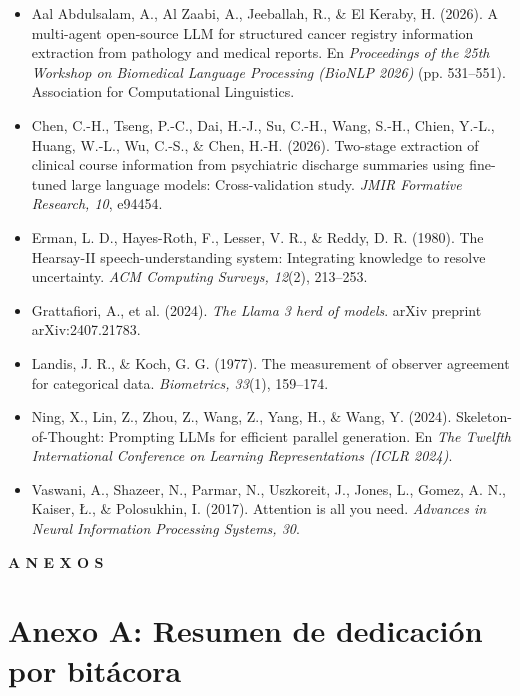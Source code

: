 \documentclass[12pt,letterpaper]{article}
\begin{document}
\begin{itemize}[leftmargin=1.27cm, label={}]
    \item Aal Abdulsalam, A., Al Zaabi, A., Jeeballah, R., \& El Keraby, H. (2026). A multi-agent open-source LLM for structured cancer registry information extraction from pathology and medical reports. En \textit{Proceedings of the 25th Workshop on Biomedical Language Processing (BioNLP 2026)} (pp. 531--551). Association for Computational Linguistics.
    \item Chen, C.-H., Tseng, P.-C., Dai, H.-J., Su, C.-H., Wang, S.-H., Chien, Y.-L., Huang, W.-L., Wu, C.-S., \& Chen, H.-H. (2026). Two-stage extraction of clinical course information from psychiatric discharge summaries using fine-tuned large language models: Cross-validation study. \textit{JMIR Formative Research, 10}, e94454.
    \item Erman, L. D., Hayes-Roth, F., Lesser, V. R., \& Reddy, D. R. (1980). The Hearsay-II speech-understanding system: Integrating knowledge to resolve uncertainty. \textit{ACM Computing Surveys, 12}(2), 213--253.
    \item Grattafiori, A., et al. (2024). \textit{The Llama 3 herd of models}. arXiv preprint arXiv:2407.21783.
    \item Landis, J. R., \& Koch, G. G. (1977). The measurement of observer agreement for categorical data. \textit{Biometrics, 33}(1), 159--174.
    \item Ning, X., Lin, Z., Zhou, Z., Wang, Z., Yang, H., \& Wang, Y. (2024). Skeleton-of-Thought: Prompting LLMs for efficient parallel generation. En \textit{The Twelfth International Conference on Learning Representations (ICLR 2024)}.
    \item Vaswani, A., Shazeer, N., Parmar, N., Uszkoreit, J., Jones, L., Gomez, A. N., Kaiser, Ł., \& Polosukhin, I. (2017). Attention is all you need. \textit{Advances in Neural Information Processing Systems, 30}.
\end{itemize}

\newpage
\begin{center}
{\large\bfseries A N E X O S}
\end{center}
\newpage

\section*{Anexo A: Resumen de dedicación por bitácora}
\end{document}
